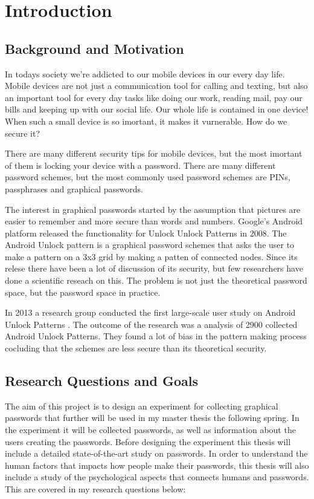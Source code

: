 \chapter{Introduction}

\section{Background and Motivation}
    
  In todays society we're addicted to our mobile devices in our every day life. Mobile devices are not just a communication tool for calling and texting, but also an important tool for every day tasks like doing our work, reading mail, pay our bills and keeping up with our social life. Our whole life is contained in one device! When such a small device is so imortant, it makes it vurnerable. How do we secure it?

  There are many different security tips for mobile devices, but the most imortant of them is locking your device with a password. There are many different password schemes, but the most commonly used password schemes are PINs, passphrases and graphical passwords.

  The interest in graphical passwords started by the assumption that pictures are easier to remember and more secure than words and numbers. Google's Android platform released the  functionality for Unlock Unlock Patterns in 2008. The Android Unlock pattern is a graphical password schemes that asks the user to make a pattern on a 3x3 grid by making a patten of connected nodes. Since its relese there have been a lot of discussion of its security, but few researchers have done a scientific reseach on this. The problem is not just the theoretical password space, but the password space in practice.

  In 2013 a research group conducted the first large-scale user study on Android Unlock Patterns \cite{Uellenbeck}. The outcome of the research was a analysis of 2900 collected Android Unlock Patterns. They found a lot of bias in the pattern making process cocluding that the schemes are less secure than its theoretical security.

\clearpage
\section{Research Questions and Goals}

  The aim of this project is to design an experiment for collecting graphical passwords that further will be used in my master thesis the following spring. In the experiment it will be collected passwords, as well as information about the users creating the passwords. Before designing the experiment this thesis will include a detailed state-of-the-art study on passwords. In order to understand the human factors that impacts how people make their passwords, this thesis will also include a study of the psychological aspects that connects humans and passwords. This are covered in my research questions below:

